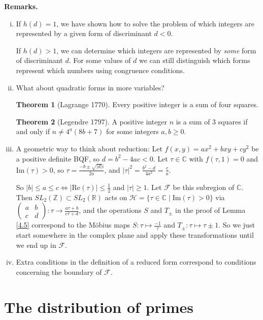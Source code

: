 \documentclass{article}
\theoremstyle{definition}
\newtheorem{theorem}{Theorem}[section]
\begin{document}
\textbf{Remarks.}
\begin{enumerate}[(i)]
    \item If $h(d)=1$, we have shown how to solve the problem of which integers are represented by a given form of discriminant $d<0$.
    
    If $h(d)>1$, we can determine which integers are represented by \textit{some} form of discriminant $d$. For some values of $d$ we can still distinguish which forms represent which numbers using congruence conditions.
    \item What about quadratic forms in more variables?
    \begin{theorem}[Lagrange 1770]
        Every positive integer is a sum of four squares.
    \end{theorem}
    \begin{theorem}[Legendre 1797]
        A positive integer $n$ is a sum of 3 squares if and only if $n \neq 4^a(8b+7)$ for some integers $a,b \ge 0$.
    \end{theorem}
    \item A geometric way to think about reduction: Let $f(x,y) = ax^2+bxy+cy^2$ be a positive definite BQF, so $d=b^2-4ac<0$. Let $\tau \in \mathbb{C}$ with $f(\tau,1)=0$ and $\text{Im}(\tau)>0$, so $\tau = \frac{-b \pm \sqrt{|d|} i}{2a}$, and $|\tau|^2 = \frac{b^2-d}{4a^2} = \frac{c}{a}$.
    
    So $|b|\le a\le c \iff |\text{Re}(\tau)|\le \frac{1}{2}$ and $|\tau| \ge 1$. Let $\mathcal{F}$ be this subregion of $\mathbb{C}$. Then $SL_2(\mathbb{Z}) \subset  SL_2(\mathbb{R})$ acts on $\mathcal{H} = \{\tau \in \mathbb{C} \mid \text{Im}(\tau)>0\}$ via $\begin{pmatrix} a & b\\c &d \end{pmatrix} : \tau \to \frac{a\tau + b}{c\tau + d}$, and the operations $S$ and $T_{\pm}$ in the proof of Lemma \ref{4.5} correspond to the Möbius maps $S: \tau \mapsto \frac{-1}{\tau}$ and $T_{\pm } : \tau \mapsto \tau \pm 1$. So we just start somewhere in the complex plane and apply these transformations until we end up in $\mathcal{F}$.

    \item Extra conditions in the definition of a reduced form correspond to conditions concerning the boundary of $\mathcal{F}$.
\end{enumerate}

\section{The distribution of primes}
\end{document}
